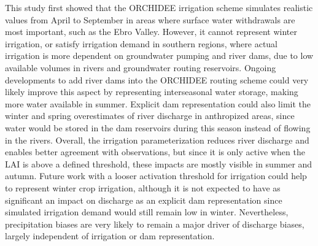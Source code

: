 This study first showed that the ORCHIDEE irrigation scheme simulates realistic values from April to September in areas where surface water withdrawals are most important, such as the Ebro Valley. However, it cannot represent winter irrigation, or satisfy irrigation demand in southern regions, where actual irrigation is more dependent on groundwater pumping and river dams, due to low available volumes in rivers and groundwater routing reservoirs. Ongoing developments to add river dams into the ORCHIDEE routing scheme \citep{baratgin_modeling_2024} could very likely improve this aspect by representing interseasonal water storage, making more water available in summer.
Explicit dam representation could also limit the winter and spring overestimates of river discharge in anthropized areas, since water would be stored in the dam reservoirs during this season instead of flowing in the rivers. 
Overall, the irrigation parameterization reduces river discharge and enables better agreement with observations, but since it is only active when the LAI is above a defined threshold, these impacts are mostly visible in summer and autumn. Future work with a looser activation threshold for irrigation could help to represent winter crop irrigation, although it is not expected to have as significant an impact on discharge as an explicit dam representation since simulated irrigation demand would still remain low in winter. Nevertheless, precipitation biases are very likely to remain a major driver of discharge biases, largely independent of irrigation or dam representation.

